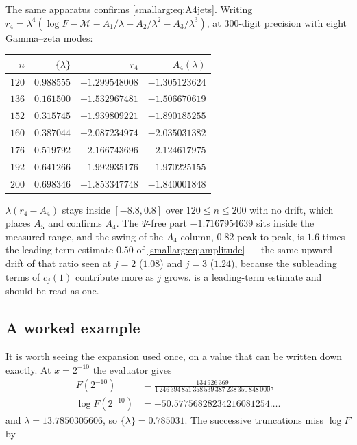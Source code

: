 \documentclass[11pt,oneside]{article}
\theoremstyle{definition}
\theoremstyle{remark}
\begin{document}
The same apparatus confirms \cref{smallarg:eq:A4jets}.  Writing
$r_4=\lambda^4(\log F-\mathcal M-A_1/\lambda-A_2/\lambda^2-A_3/\lambda^3)$,
at $300$-digit precision with eight Gamma--zeta modes:

\begin{center}\small
\begin{tabular}{@{}rrrr@{}}
\toprule
$n$ & $\{\lambda\}$ & $r_4$ & $A_4(\lambda)$\\
\midrule
$120$ & $0.988555$ & $-1.299548008$ & $-1.305123624$\\
$136$ & $0.161500$ & $-1.532967481$ & $-1.506670619$\\
$152$ & $0.315745$ & $-1.939809221$ & $-1.890185255$\\
$160$ & $0.387044$ & $-2.087234974$ & $-2.035031382$\\
$176$ & $0.519792$ & $-2.166743696$ & $-2.124617975$\\
$192$ & $0.641266$ & $-1.992935176$ & $-1.970225155$\\
$200$ & $0.698346$ & $-1.853347748$ & $-1.840001848$\\
\bottomrule
\end{tabular}
\end{center}

$\lambda(r_4-A_4)$ stays inside $[-8.8,0.8]$ over $120\le n\le200$ with no
drift, which places $A_5$ and confirms $A_4$.  The $\Psi$-free part
$-1.7167954639$ sits inside the measured range, and the swing of the
$A_4$ column, $0.82$ peak to peak, is $1.6$ times the leading-term estimate
$0.50$ of \cref{smallarg:eq:amplitude} --- the same upward drift of that ratio seen
at $j=2$ ($1.08$) and $j=3$ ($1.24$), because the subleading terms of
$c_j(1)$ contribute more as $j$ grows.   is a
leading-term estimate and should be read as one.

\subsection{A worked example}\label{smallarg:sec:worked}

It is worth seeing the expansion used once, on a value that can be written
down exactly.  At $x=2^{-10}$ the evaluator gives
\[
\begin{aligned}
  F(2^{-10})
    &=\frac{134\,926\,369}
      {1\,246\,394\,851\,358\,539\,387\,238\,350\,848\,000},\\
  \log F(2^{-10})&=-50.57756828234216081254\dots .
\end{aligned}
\]
and $\lambda=13.7850305606$, so $\{\lambda\}=0.785031$.  The successive
truncations miss $\log F$ by
\end{document}
